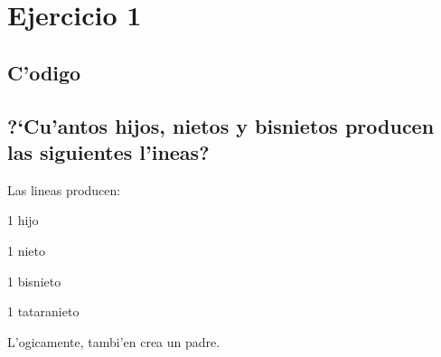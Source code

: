 \documentclass[a4paper,8pt]{article}
\newcommand{\?}{?`}
\begin{document}

\setcounter{page}{1}
\tableofcontents
\newpage
\setcounter{page}{1}

\section{Ejercicio 1}

\subsection{C'odigo}

\subsection[Punto A]{\?Cu'antos hijos, nietos y bisnietos producen las siguientes l'ineas?}
Las lineas producen:
\begin{description}
 \item 1 hijo
 \item 1 nieto
 \item 1 bisnieto
 \item 1 tataranieto
\end{description}

L'ogicamente, tambi'en crea un padre.
\end{document}
